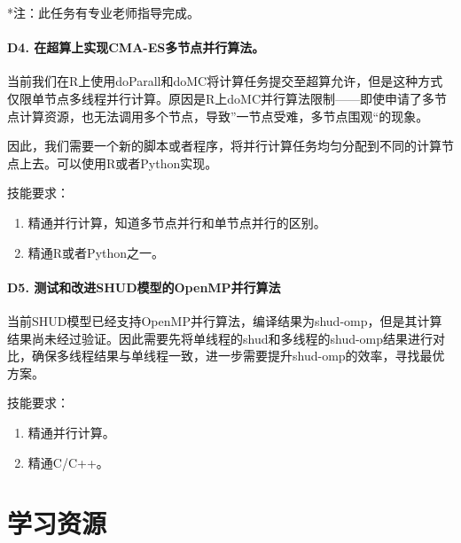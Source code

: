 \documentclass[
]{book}
\providecommand{\tightlist}{%
  \setlength{\itemsep}{0pt}\setlength{\parskip}{0pt}}
\begin{document}
*注：此任务有专业老师指导完成。

\hypertarget{d4.-ux5728ux8d85ux7b97ux4e0aux5b9eux73b0cma-esux591aux8282ux70b9ux5e76ux884cux7b97ux6cd5}{%
\subsubsection{\texorpdfstring{\textbf{D4. 在超算上实现CMA-ES多节点并行算法。}}{D4. 在超算上实现CMA-ES多节点并行算法。}}\label{d4.-ux5728ux8d85ux7b97ux4e0aux5b9eux73b0cma-esux591aux8282ux70b9ux5e76ux884cux7b97ux6cd5}}

当前我们在R上使用doParall和doMC将计算任务提交至超算允许，但是这种方式仅限单节点多线程并行计算。原因是R上doMC并行算法限制------即使申请了多节点计算资源，也无法调用多个节点，导致''一节点受难，多节点围观``的现象。

因此，我们需要一个新的脚本或者程序，将并行计算任务均匀分配到不同的计算节点上去。可以使用R或者Python实现。

技能要求：

\begin{enumerate}
\def\labelenumi{\arabic{enumi}.}
\tightlist
\item
  精通并行计算，知道多节点并行和单节点并行的区别。
\item
  精通R或者Python之一。
\end{enumerate}

\hypertarget{d5.-ux6d4bux8bd5ux548cux6539ux8fdbshudux6a21ux578bux7684openmpux5e76ux884cux7b97ux6cd5}{%
\subsubsection{\texorpdfstring{\textbf{D5. 测试和改进SHUD模型的OpenMP并行算法}}{D5. 测试和改进SHUD模型的OpenMP并行算法}}\label{d5.-ux6d4bux8bd5ux548cux6539ux8fdbshudux6a21ux578bux7684openmpux5e76ux884cux7b97ux6cd5}}

当前SHUD模型已经支持OpenMP并行算法，编译结果为shud-omp，但是其计算结果尚未经过验证。因此需要先将单线程的shud和多线程的shud-omp结果进行对比，确保多线程结果与单线程一致，进一步需要提升shud-omp的效率，寻找最优方案。

技能要求：

\begin{enumerate}
\def\labelenumi{\arabic{enumi}.}
\tightlist
\item
  精通并行计算。
\item
  精通C/C++。
\end{enumerate}

\hypertarget{ux5b66ux4e60ux8d44ux6e90}{%
\chapter{学习资源}\label{ux5b66ux4e60ux8d44ux6e90}}
\end{document}

